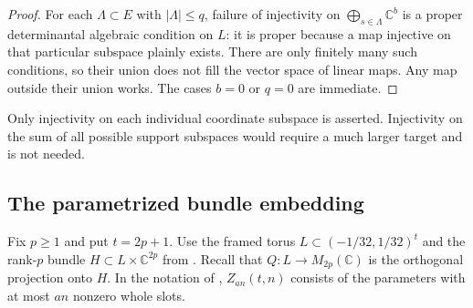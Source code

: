 \begin{proof}
For each $\Lambda\subset E$ with $|\Lambda|\leq q$, failure of
injectivity on $\bigoplus_{s\in\Lambda}\mathbb C^b$ is a proper
determinantal algebraic condition on $L$: it is proper because a map
injective on that particular subspace plainly exists.  There are only
finitely many such conditions, so their union does not fill the vector
space of linear maps.  Any map outside their union works.  The cases
$b=0$ or $q=0$ are immediate.
\end{proof}

Only injectivity on each individual coordinate subspace is asserted.
Injectivity on the sum of all possible support subspaces would require
a much larger target and is not needed.

\subsection{The parametrized bundle embedding}

Fix $p\geq1$ and put $t=2p+1$.  Use the framed torus
$L\subset(-1/32,1/32)^t$ and the rank-$p$ bundle
$H\subset L\times\mathbb C^{2p}$ from
. Recall that
$Q:L\to M_{2p}(\mathbb C)$ is the orthogonal projection onto $H$.
In the notation of
, $Z_{an}(t,n)$ consists of the parameters with at
most $an$ nonzero whole slots.

